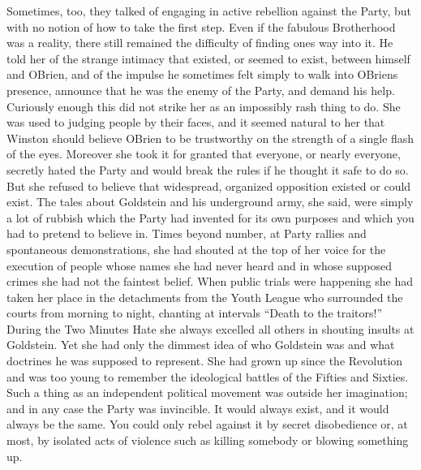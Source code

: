 Sometimes, too, they talked of engaging in active rebellion against the
Party, but with no notion of how to take the first step. Even if the
fabulous Brotherhood was a reality, there still remained the difficulty
of finding one\textquotesingle s way into it. He told her of the strange
intimacy that existed, or seemed to exist, between himself and
O\textquotesingle Brien, and of the impulse he sometimes felt simply to
walk into O\textquotesingle Brien\textquotesingle s presence, announce
that he was the enemy of the Party, and demand his help. Curiously
enough this did not strike her as an impossibly rash thing to do. She
was used to judging people by their faces, and it seemed natural to her
that Winston should believe O\textquotesingle Brien to be trustworthy on
the strength of a single flash of the eyes. Moreover she took it for
granted that everyone, or nearly everyone, secretly hated the Party and
would break the rules if he thought it safe to do so. But she refused to
believe that widespread, organized opposition existed or could exist.
The tales about Goldstein and his underground army, she said, were
simply a lot of rubbish which the Party had invented for its own
purposes and which you had to pretend to believe in. Times beyond
number, at Party rallies and spontaneous demonstrations, she had shouted
at the top of her voice for the execution of people whose names she had
never heard and in whose supposed crimes she had not the faintest
belief. When public trials were happening she had taken her place in the
detachments from the Youth League who surrounded the courts from morning
to night, chanting at intervals ``Death to the traitors!'' During the Two
Minutes Hate she always excelled all others in shouting insults at
Goldstein. Yet she had only the dimmest idea of who Goldstein was and
what doctrines he was supposed to represent. She had grown up since the
Revolution and was too young to remember the ideological battles of the
Fifties and Sixties. Such a thing as an independent political movement
was outside her imagination; and in any case the Party was invincible.
It would always exist, and it would always be the same. You could only
rebel against it by secret disobedience or, at most, by isolated acts of
violence such as killing somebody or blowing something up.

